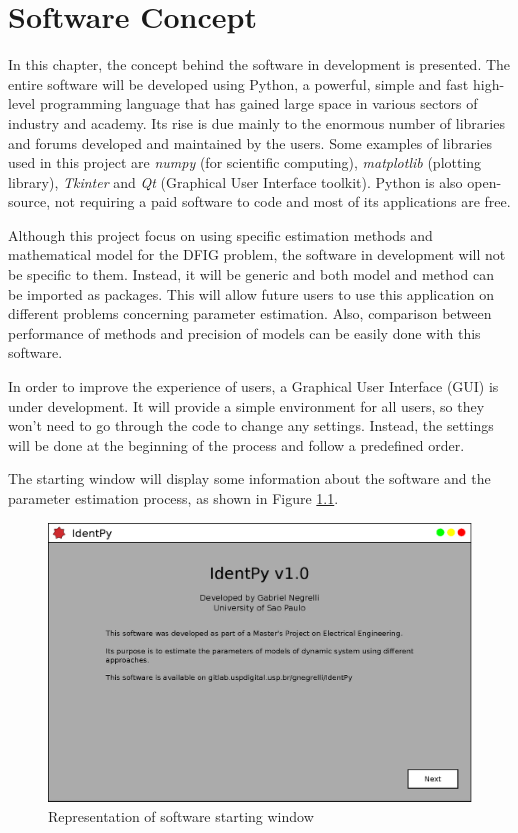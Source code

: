\chapter{Software Concept}

\label{ch: software}

In this chapter, the concept behind the software in development is presented. The entire software will be developed using Python, a powerful, simple and fast high-level programming language that has gained large space in various sectors of industry and academy. Its rise is due mainly to the enormous number of libraries and forums developed and maintained by the users. Some examples of libraries used in this project are \textit{numpy} (for scientific computing), \textit{matplotlib} (plotting library), \textit{Tkinter} and \textit{Qt} (Graphical User Interface toolkit). Python is also open-source, not requiring a paid software to code and most of its applications are free.

Although this project focus on using specific estimation methods and mathematical model for the DFIG problem, the software in development will not be specific to them. Instead, it will be generic and both model and method can be imported as packages. This will allow future users to use this application on different problems concerning parameter estimation. Also, comparison between performance of methods and precision of models can be easily done with this software.

In order to improve the experience of users, a Graphical User Interface (GUI) is under development. It will provide a simple environment for all users, so they won't need to go through the code to change any settings. Instead, the settings will be done at the beginning of the process and follow a predefined order.

The starting window will display some information about the software and the parameter estimation process, as shown in Figure \ref{fig: init_pg}.

\begin{figure}[h]
	\caption{Representation of software starting window}
	\begin{center}
		\includegraphics[scale=.5]{Images/Software_init_pg.eps}
	\end{center}
	\label{fig: init_pg}
\end{figure}

